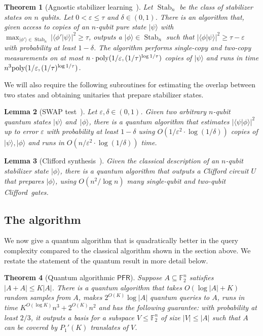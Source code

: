 \documentclass[11pt]{amsart}
\DeclareMathOperator{\Stab}{Stab}\DeclareMathOperator{\Spec}{Spec}
\newcommand{\PFR}{\textsf{PFR}}
\newcommand{\poly}{\mbox{\rm poly}}
\newcommand{\ket}[1]{|#1\rangle}
\theoremstyle{plain}
\newtheorem{theorem}{Theorem}[section]
\newtheorem{lemma}[theorem]{Lemma}
\theoremstyle{definition}
\theoremstyle{remark}
\begin{document}
\begin{theorem}[Agnostic stabilizer learning~\cite{chen2024stabilizer}]
\label{thm:sitanbootstrapping}
Let $\Stab_n$ be  the class of stabilizer states on $n$ qubits. Let $0<\varepsilon\leq \tau$ and $\delta \in (0,1)$.
There is an algorithm that, given access to copies of an $n$-qubit pure state $\ket{\psi}$ with $\max_{\ket{\phi'} \in \Stab_n} |\langle \phi' | \psi \rangle|^2 \geq \tau$, outputs a $\ket{\phi} \in \Stab_n$ such that $|\langle \phi | \psi \rangle|^2 \geq \tau - \varepsilon$ with probability at least $1-\delta$.
The algorithm performs single-copy and two-copy measurements on at most $n\cdot \poly(1/\varepsilon,(1/\tau)^{\log 1/\tau})$ copies of $\ket{\psi}$ and runs in time $n^3 \poly(1/\varepsilon, (1/\tau)^{\log 1/\tau})$.
\end{theorem}
We will also require the following subroutines for estimating the overlap between two states and obtaining unitaries that prepare stabilizer states.
\begin{lemma}[\textsf{SWAP} test~\cite{nielsen2010quantum}]
\label{lem:swap_test}
Let $\varepsilon,\delta \in (0,1)$. Given two arbitrary $n$-qubit quantum states $\ket{\psi}$ and~$\ket{\phi}$, there is a quantum algorithm that estimates $|\langle \psi | \phi \rangle|^2$ up to error $\varepsilon$ with probability at least $1-\delta$ using $O(1/\varepsilon^2\cdot \log(1/\delta))$ copies of $\ket{\psi},\ket{\phi}$ and runs in $O(n/\varepsilon^2\cdot \log(1/\delta))$ time.
\end{lemma}

\begin{lemma}[Clifford synthesis~\cite{aaranson2004sim}]\label{lem:clifford_synthesis}
Given the classical description of an $n$-qubit stabilizer state $\ket{\phi}$, there is a quantum algorithm that outputs a Clifford circuit $U$ that prepares $\ket{\phi}$, using $O(n^2/\log n)$ many single-qubit and two-qubit Clifford~gates.
\end{lemma}

\subsection{The algorithm}

We now give a quantum algorithm that is quadratically better in the query complexity compared to the classical algorithm shown in the section above. We restate the statement of the quantum result in more detail below.

\begin{theorem}[Quantum algorithmic $\PFR$]
\label{thm:algoquantumPFR1}
    Suppose $A \subseteq \mathbb{F}_2^n$ satisfies $|A + A| \leq K|A|$.
    There is a quantum algorithm that takes $O(\log|A| + K)$ random samples from $A$, makes $2^{O(K)} \log |A|$ quantum queries to $A$, runs in time $K^{O(\log K)} n^3 + 2^{O(K)}n^2$ and has the following guarantee:
    with probability at least $2/3$, it outputs a basis for a subspace $V \leq \mathbb{F}_2^n$ of size $|V| \leq |A|$ such that $A$ can be covered by $P_1'(K)$ translates of $V$.
\end{theorem}
\end{document}
